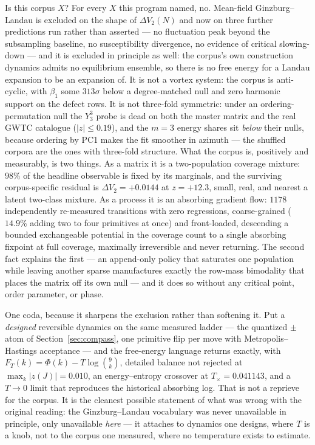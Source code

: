 \documentclass[11pt,a4paper]{article}
\theoremstyle{plain}
\theoremstyle{remark}
\theoremstyle{plain}
\begin{document}
Is this corpus $X$? For every $X$ this program named, no. Mean-field
Ginzburg--Landau is excluded on the shape of $\Delta V_2(N)$ and now on three
further predictions run rather than asserted --- no fluctuation peak beyond the
subsampling baseline, no susceptibility divergence, no evidence of critical slowing-down ---
and it is excluded in principle as well: the corpus's own construction dynamics
admits no equilibrium ensemble, so there is no free energy for a Landau expansion
to be an expansion of. It is not a vortex system: the corpus is anti-cyclic, with
$\beta_1$ some $313\sigma$ below a degree-matched null and zero harmonic support
on the defect rows. It is not three-fold symmetric: under an ordering-permutation
null the $Y_3^3$ probe is dead on both the master matrix and the real GWTC
catalogue ($|z|\le0.19$), and the $m{=}3$ energy shares sit \emph{below} their
nulls, because ordering by PC1 makes the fit smoother in azimuth --- the shuffled
corpora are the ones with three-fold structure. What the corpus is, positively and
measurably, is two things. As a matrix it is a two-population coverage mixture:
$98\%$ of the headline observable is fixed by its marginals, and the surviving
corpus-specific residual is $\Delta V_2=+0.0144$ at $z=+12.3$, small, real, and
nearest a latent two-class mixture. As a process it is an absorbing gradient flow:
$1178$ independently re-measured transitions with zero regressions, coarse-grained
($14.9\%$ adding two to four primitives at once) and front-loaded, descending a
bounded exchangeable potential in the coverage count to a single absorbing fixpoint
at full coverage, maximally irreversible and never returning. The second fact
explains the first --- an append-only policy that saturates one population while
leaving another sparse manufactures exactly the row-mass bimodality that places the
matrix off its own null --- and it does so without any critical point, order
parameter, or phase.

One coda, because it sharpens the exclusion rather than softening it. Put a
\emph{designed} reversible dynamics on the same measured ladder --- the quantized
$\pm$ atom of Section~\ref{sec:compass}, one primitive flip per move with
Metropolis--Hastings acceptance --- and the free-energy language returns exactly,
with $F_T(k)=\Phi(k)-T\log\binom{9}{k}$, detailed balance not rejected at
$\max_k|z(J)|=0.010$, an energy--entropy crossover at $T_\times=0.041143$, and a
$T\to0$ limit that reproduces the historical absorbing log. That is not a
reprieve for the corpus. It is the cleanest possible statement of what was wrong
with the original reading: the Ginzburg--Landau vocabulary was never unavailable
in principle, only unavailable \emph{here} --- it attaches to dynamics one
designs, where $T$ is a knob, not to the corpus one measured, where no temperature
exists to estimate.
\end{document}
